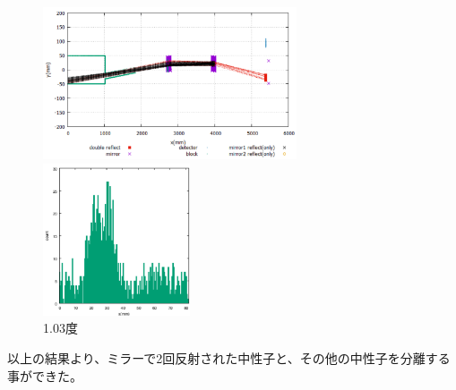 \begin{figure}[H]
\begin{minipage}{0.50\hsize}
\begin{center}
\includegraphics[height=4.5cm]{angle/anaonesim.png}
\end{center}
\end{minipage}
\begin{minipage}{0.50\hsize}
\begin{center}
\includegraphics[height=4.5cm]{angle/anaoneex.png}
\end{center}
\end{minipage}
\caption{1.03度}
\end{figure}

以上の結果より、ミラーで2回反射された中性子と、その他の中性子を分離する事ができた。
